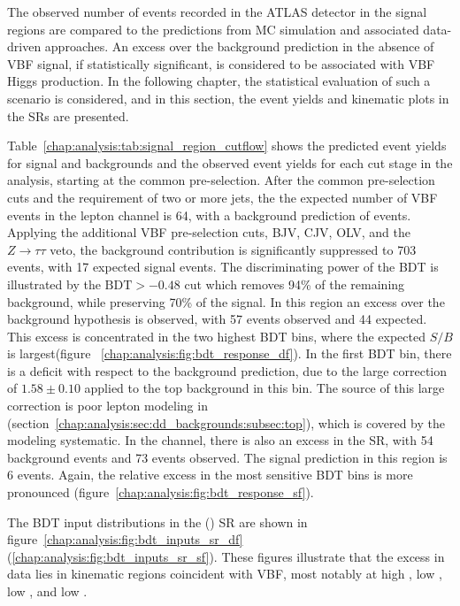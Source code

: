 
The observed number of events recorded in the ATLAS detector in the
signal regions are compared to the
predictions from MC simulation and associated data-driven
approaches. An excess over the background prediction in the absence
of VBF signal, if statistically significant, is considered to be
associated with VBF Higgs production. In the following chapter, the
statistical evaluation of such a scenario is considered, and in this
section, the event yields and kinematic plots in the SRs are presented. 

Table~\ref{chap:analysis:tab:signal_region_cutflow} shows the
predicted event yields for signal and backgrounds and the observed
event yields for each cut stage in the analysis, starting at the
common pre-selection. After the common pre-selection cuts and the
requirement of two or more jets, the the expected number of VBF events in
the \emme lepton channel is 64, with a background prediction of
 events. Applying the additional VBF pre-selection
cuts, BJV, CJV, OLV, and the $Z\rightarrow{\tau\tau}$ veto, the
background contribution is significantly suppressed to 703 events,
with 17 expected signal events. The discriminating power of the BDT is
illustrated by the $\textrm{BDT} > -0.48$ cut which removes 94\% of
the remaining background, while preserving 70\% of the signal. In this
region an excess over the background hypothesis is observed, with 57
events observed and 44 expected. This excess is concentrated in the
two highest BDT bins, where the expected $S/B$ is
largest(figure ~\ref{chap:analysis:fig:bdt_response_df}). In the
first BDT bin, there is a deficit with respect to the background
prediction, due to the large correction of $1.58 \pm 0.10$ applied to
the top background in this bin. The source of this large correction is
poor lepton modeling in \POWHEG
(section~\ref{chap:analysis:sec:dd_backgrounds:subsec:top}), which is
covered by the modeling systematic. In the \eemm channel, there is
also an excess in the SR, with 54 background events and 73 events
observed. The signal prediction in this region is 6 events. Again, the
relative excess in the most sensitive BDT bins is more pronounced
(figure~\ref{chap:analysis:fig:bdt_response_sf}). 

The BDT input distributions in the \emme (\eemm) SR are shown in
figure~\ref{chap:analysis:fig:bdt_inputs_sr_df}
(\ref{chap:analysis:fig:bdt_inputs_sr_sf}). These figures illustrate
that the excess in data lies in kinematic regions coincident with VBF,
most notably at high \mjj, low \dphill, low \mll, and low \pttot. 

